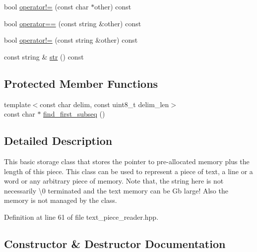 \begin{DoxyCompactItemize}
bool \hyperlink{classuva_1_1utils_1_1file_1_1text__piece__reader_a92d7b0e60dd413d6f2178ff5d39ab7f8}{operator!=} (const char $\ast$other) const 
\item 
bool \hyperlink{classuva_1_1utils_1_1file_1_1text__piece__reader_ae1da5f2b7c17d3f42a73b42cc7fbf6e3}{operator==} (const string \&other) const 
\item 
bool \hyperlink{classuva_1_1utils_1_1file_1_1text__piece__reader_a9927598b8efdeac55bb7a2d598c19f24}{operator!=} (const string \&other) const 
\item 
const string \& \hyperlink{classuva_1_1utils_1_1file_1_1text__piece__reader_a786a6678fb7b8321b9661ccd627cd31f}{str} () const 
\end{DoxyCompactItemize}
\subsection*{Protected Member Functions}
\begin{DoxyCompactItemize}
\item 
{\footnotesize template$<$const char delim, const uint8\+\_\+t delim\+\_\+len$>$ }\\const char $\ast$ \hyperlink{classuva_1_1utils_1_1file_1_1text__piece__reader_a6de5aa1b1930ed38d0731342489c9f06}{find\+\_\+first\+\_\+subseq} ()
\end{DoxyCompactItemize}


\subsection{Detailed Description}
This basic storage class that stores the pointer to pre-\/allocated memory plus the length of this piece. This class can be used to represent a piece of text, a line or a word or any arbitrary piece of memory. Note that, the string here is not necessarily \textbackslash{}0 terminated and the text memory can be Gb large! Also the memory is not managed by the class. 

Definition at line 61 of file text\+\_\+piece\+\_\+reader.\+hpp.



\subsection{Constructor \& Destructor Documentation}
\hypertarget{classuva_1_1utils_1_1file_1_1text__piece__reader_ae04b4169c4468a42edb27d8b5b7018cd}{}
